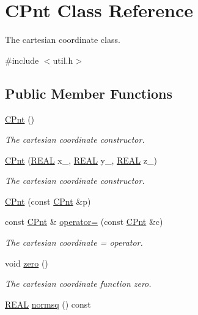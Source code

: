 \hypertarget{classCPnt}{\section{C\-Pnt Class Reference}
\label{classCPnt}
}


The cartesian coordinate class.  




{\ttfamily \#include $<$util.\-h$>$}

\subsection*{Public Member Functions}
\begin{DoxyCompactItemize}
\item 
\hyperlink{classCPnt_a6792dcfc8b95c18c03bda5a6dde7765a}{C\-Pnt} ()
\begin{DoxyCompactList}\small\item\em The cartesian coordinate constructor. \end{DoxyCompactList}\item 
\hyperlink{classCPnt_a91907d073421cdf75000d27f982f058b}{C\-Pnt} (\hyperlink{util_8h_a5821460e95a0800cf9f24c38915cbbde}{R\-E\-A\-L} x\-\_\-, \hyperlink{util_8h_a5821460e95a0800cf9f24c38915cbbde}{R\-E\-A\-L} y\-\_\-, \hyperlink{util_8h_a5821460e95a0800cf9f24c38915cbbde}{R\-E\-A\-L} z\-\_\-)
\begin{DoxyCompactList}\small\item\em The cartesian coordinate constructor. \end{DoxyCompactList}\item 
\hyperlink{classCPnt_aca4d8d7044e71700128b497cfcc4f1d8}{C\-Pnt} (const \hyperlink{classCPnt}{C\-Pnt} \&p)
\item 
const \hyperlink{classCPnt}{C\-Pnt} \& \hyperlink{classCPnt_abd18aa7c83ac70f5e73847a8cd154e9d}{operator=} (const \hyperlink{classCPnt}{C\-Pnt} \&c)
\begin{DoxyCompactList}\small\item\em The cartesian coordinate = operator. \end{DoxyCompactList}\item 
void \hyperlink{classCPnt_a619a71665a5a40fddbc8e6c6a6b450cc}{zero} ()
\begin{DoxyCompactList}\small\item\em The cartesian coordinate function zero. \end{DoxyCompactList}\item 
\hyperlink{util_8h_a5821460e95a0800cf9f24c38915cbbde}{R\-E\-A\-L} \hyperlink{classCPnt_ac4dcf209c35c4ef0c119cd59fbddd18f}{normsq} () const 

\end{DoxyCompactItemize}
